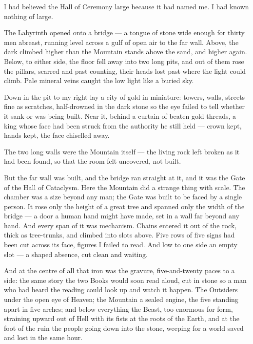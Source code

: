 I had believed the Hall of Ceremony large because it had named me. I had known nothing of large.\par

The Labyrinth opened onto a bridge --- a tongue of stone wide enough for thirty men abreast, running level across a gulf of open air to the far wall. Above, the dark climbed higher than the Mountain stands above the sand, and higher again. Below, to either side, the floor fell away into two long pits, and out of them rose the pillars, scarred and past counting, their heads lost past where the light could climb. Pale mineral veins caught the low light like a buried sky.\par

Down in the pit to my right lay a city of gold in miniature: towers, walls, streets fine as scratches, half-drowned in the dark stone so the eye failed to tell whether it sank or was being built. Near it, behind a curtain of beaten gold threads, a king whose face had been struck from the authority he still held --- crown kept, hands kept, the face chiselled away.\par

The two long walls were the Mountain itself --- the living rock left broken as it had been found, so that the room felt uncovered, not built.\par

But the far wall was built, and the bridge ran straight at it, and it was the Gate of the Hall of Cataclysm. Here the Mountain did a strange thing with scale. The chamber was a size beyond any man; the Gate was built to be faced by a single person. It rose only the height of a great tree and spanned only the width of the bridge --- a door a human hand might have made, set in a wall far beyond any hand. And every span of it was mechanism. Chains entered it out of the rock, thick as tree-trunks, and climbed into slots above. Five rows of five signs had been cut across its face, figures I failed to read. And low to one side an empty slot --- a shaped absence, cut clean and waiting.\par

And at the centre of all that iron was the gravure, five-and-twenty paces to a side: the same story the two Books would soon read aloud, cut in stone so a man who had heard the reading could look up and watch it happen. The Outsiders under the open eye of Heaven; the Mountain a sealed engine, the five standing apart in five arches; and below everything the Beast, too enormous for form, straining upward out of Hell with its fists at the roots of the Earth, and at the foot of the ruin the people going down into the stone, weeping for a world saved and lost in the same hour.\par

